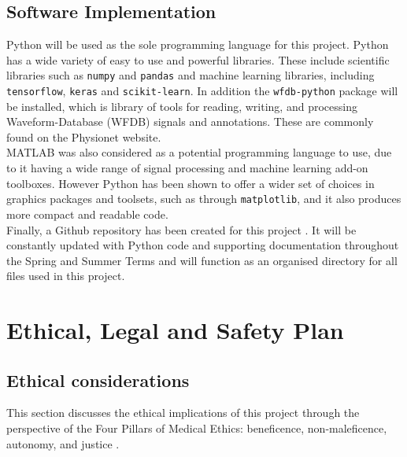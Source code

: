 \documentclass[11pt, a4paper]{article}
\begin{document}
\subsection{Software Implementation}
Python will be used as the sole programming language for this project. Python has a wide variety of easy to use and powerful libraries. These include scientific libraries such as \texttt{numpy} and \texttt{pandas} and machine learning libraries, including \texttt{tensorflow}, \texttt{keras} and \texttt{scikit-learn}. In addition the \texttt{wfdb-python} package will be installed, which is library of tools for reading, writing, and processing Waveform-Database (WFDB) signals and annotations. These are commonly found on the Physionet website. \\ \newline \noindent MATLAB was also considered as a potential programming language to use, due to it having a wide range of signal processing and machine learning add-on toolboxes. However Python has been shown to offer a wider set of choices in graphics packages and toolsets, such as through \texttt{matplotlib}, and it also produces more compact and readable code. \\ \newline \noindent Finally, a Github repository has been created for this project \cite{Github}. It will be constantly updated with Python code and supporting documentation throughout the Spring and Summer Terms and will function as an organised directory for all files used in this project.

\newpage

\section{Ethical, Legal and Safety Plan}

\subsection{Ethical considerations}
This section discusses the ethical implications of this project through the perspective of the Four Pillars of Medical Ethics: beneficence, non-maleficence, autonomy, and justice \cite{MedicalEthics}. 
\end{document}
